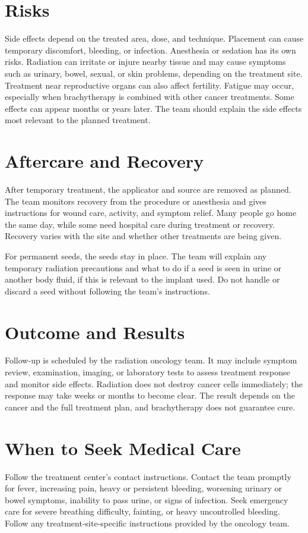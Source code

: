 \section*{Risks}
Side effects depend on the treated area, dose, and technique. Placement can cause temporary discomfort, bleeding, or infection. Anesthesia or sedation has its own risks. Radiation can irritate or injure nearby tissue and may cause symptoms such as urinary, bowel, sexual, or skin problems, depending on the treatment site. Treatment near reproductive organs can also affect fertility. Fatigue may occur, especially when brachytherapy is combined with other cancer treatments. Some effects can appear months or years later. The team should explain the side effects most relevant to the planned treatment.

\section*{Aftercare and Recovery}
After temporary treatment, the applicator and source are removed as planned. The team monitors recovery from the procedure or anesthesia and gives instructions for wound care, activity, and symptom relief. Many people go home the same day, while some need hospital care during treatment or recovery. Recovery varies with the site and whether other treatments are being given.

For permanent seeds, the seeds stay in place. The team will explain any temporary radiation precautions and what to do if a seed is seen in urine or another body fluid, if this is relevant to the implant used. Do not handle or discard a seed without following the team's instructions.

\section*{Outcome and Results}
Follow-up is scheduled by the radiation oncology team. It may include symptom review, examination, imaging, or laboratory tests to assess treatment response and monitor side effects. Radiation does not destroy cancer cells immediately; the response may take weeks or months to become clear. The result depends on the cancer and the full treatment plan, and brachytherapy does not guarantee cure.

\section*{When to Seek Medical Care}
Follow the treatment center's contact instructions. Contact the team promptly for fever, increasing pain, heavy or persistent bleeding, worsening urinary or bowel symptoms, inability to pass urine, or signs of infection. Seek emergency care for severe breathing difficulty, fainting, or heavy uncontrolled bleeding. Follow any treatment-site-specific instructions provided by the oncology team.

